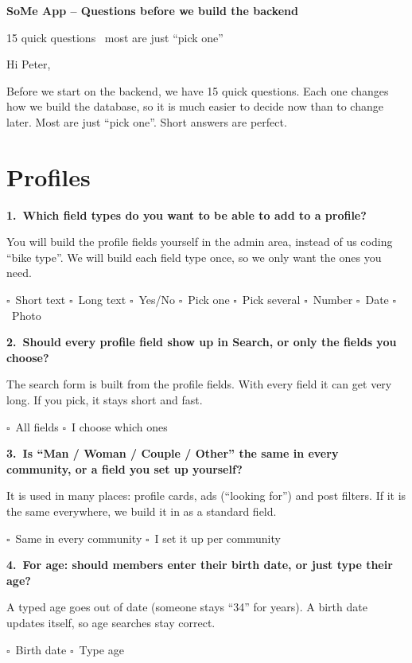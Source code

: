 \documentclass[11pt,a4paper]{article}
\newcommand{\answerbox}{$\square$\ }
\newenvironment{question}[2]
  {\par\medskip\textbf{#1.\ #2}\par\nopagebreak\color{muted}}
  {\par}
\newcommand{\options}[1]{\par\color{black}#1\par}
\begin{document}
{\LARGE\bfseries SoMe App -- Questions before we build the backend}\par
\vspace{4pt}
{\color{muted}15 quick questions \textbullet\ most are just ``pick one''}

\vspace{12pt}
Hi Peter,

Before we start on the backend, we have 15 quick questions. Each one changes how we build the database, so it is much easier to decide now than to change later. Most are just ``pick one''. Short answers are perfect.

\section{Profiles}

\begin{question}{1}{Which field types do you want to be able to add to a profile?}
You will build the profile fields yourself in the admin area, instead of us coding ``bike type''. We will build each field type once, so we only want the ones you need.
\options{\answerbox Short text \quad \answerbox Long text \quad \answerbox Yes/No \quad \answerbox Pick one \quad \answerbox Pick several \quad \answerbox Number \quad \answerbox Date \quad \answerbox Photo}
\end{question}

\begin{question}{2}{Should every profile field show up in Search, or only the fields you choose?}
The search form is built from the profile fields. With every field it can get very long. If you pick, it stays short and fast.
\options{\answerbox All fields \qquad \answerbox I choose which ones}
\end{question}

\begin{question}{3}{Is ``Man / Woman / Couple / Other'' the same in every community, or a field you set up yourself?}
It is used in many places: profile cards, ads (``looking for'') and post filters. If it is the same everywhere, we build it in as a standard field.
\options{\answerbox Same in every community \qquad \answerbox I set it up per community}
\end{question}

\begin{question}{4}{For age: should members enter their birth date, or just type their age?}
A typed age goes out of date (someone stays ``34'' for years). A birth date updates itself, so age searches stay correct.
\options{\answerbox Birth date \qquad \answerbox Type age}
\end{question}
\end{document}
